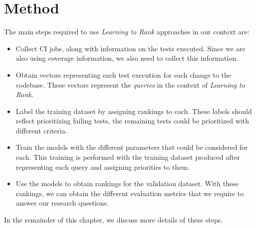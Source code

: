 \chapter{Method}\label{s:method}
The main steps required to use \emph{Learning to Rank} approaches in our context are:
\begin{itemize}
    \item Collect CI jobs, along with information on the tests executed. Since we are also using coverage information, we also need to collect this information.
    \item Obtain vectors representing each test execution for each change to the codebase. These vectors represent the \emph{queries} in the context of \emph{Learning to Rank}.
    \item Label the training dataset by assigning rankings to each. These labels should reflect prioritizing failing tests, the remaining tests could be prioritized with different criteria.
    \item Train the models with the different parameters that could be considered for each. This training is performed with the training dataset produced after representing each query and assigning priorities to them.
    \item Use the models to obtain rankings for the validation dataset. With these rankings, we can obtain the different evaluation metrics that we require to answer our research questions.
\end{itemize}

In the remainder of this chapter, we discuss more details of these steps.




